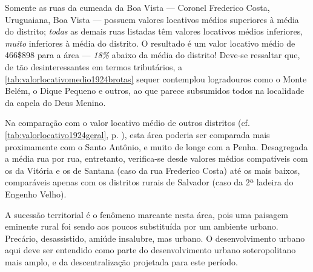 Somente as ruas da cumeada da Boa Vista --- Coronel Frederico Costa, Uruguaiana, Boa Vista --- possuem valores locativos médios superiores à média do distrito; \textit{todas} as demais ruas listadas têm valores locativos médios inferiores, \textit{muito} inferiores à média do distrito. O resultado é um valor locativo médio de 466\$898 para a área --- \textit{18\%} abaixo da média do distrito! Deve-se ressaltar que, de tão desinteressantes em termos tributários, a \autoref{tab:valorlocativomedio1924brotas} sequer contemplou logradouros como o Monte Belém, o Dique Pequeno e outros, ao que parece subsumidos todos na localidade da capela do Deus Menino.

Na comparação com o valor locativo médio de outros distritos (cf. \autoref{tab:valorlocativo1924geral}, p. \pageref{tab:valorlocativo1924geral}), esta área poderia ser comparada mais proximamente com o Santo Antônio, e muito de longe com a Penha. Desagregada a média rua por rua, entretanto, verifica-se desde valores médios compatíveis com os da Vitória e os de Santana (caso da rua Frederico Costa) até os mais baixos, comparáveis apenas com os distritos rurais de Salvador (caso da 2ª ladeira do Engenho Velho).


A sucessão territorial é o fenômeno marcante nesta área, pois uma paisagem eminente rural foi sendo aos poucos substituída por um ambiente urbano. Precário, desassistido, amiúde insalubre, mas urbano. O desenvolvimento urbano aqui deve ser entendido como parte do desenvolvimento urbano soteropolitano mais amplo, e da descentralização projetada para este período.


